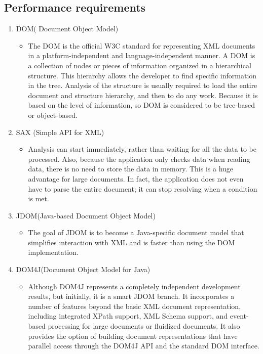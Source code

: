 \subsection{Performance requirements}
\begin{enumerate}
    \item DOM( Document Object Model)
    \begin{itemize}
        \item The DOM is the official W3C standard for representing XML documents in a platform-independent and language-independent manner. A DOM is a collection of nodes or pieces of information organized in a hierarchical structure. This hierarchy allows the developer to find specific information in the tree. Analysis of the structure is usually required to load the entire document and structure hierarchy, and then to do any work. Because it is based on the level of information, so DOM is considered to be tree-based or object-based.
    \end{itemize}
    \item SAX (Simple API for XML)
    \begin{itemize}
        \item Analysis can start immediately, rather than waiting for all the data to be processed. Also, because the application only checks data when reading data, there is no need to store the data in memory. This is a huge advantage for large documents. In fact, the application does not even have to parse the entire document; it can stop resolving when a condition is met.
    \end{itemize}
    \item JDOM(Java-based Document Object Model)
    \begin{itemize}
        \item The goal of JDOM is to become a Java-specific document model that simplifies interaction with XML and is faster than using the DOM implementation.
    \end{itemize}
    \item DOM4J(Document Object Model for Java)
    \begin{itemize}
        \item Although DOM4J represents a completely independent development results, but initially, it is a smart JDOM branch. It incorporates a number of features beyond the basic XML document representation, including integrated XPath support, XML Schema support, and event-based processing for large documents or fluidized documents. It also provides the option of building document representations that have parallel access through the DOM4J API and the standard DOM interface. 
    \end{itemize}
\end{enumerate}

